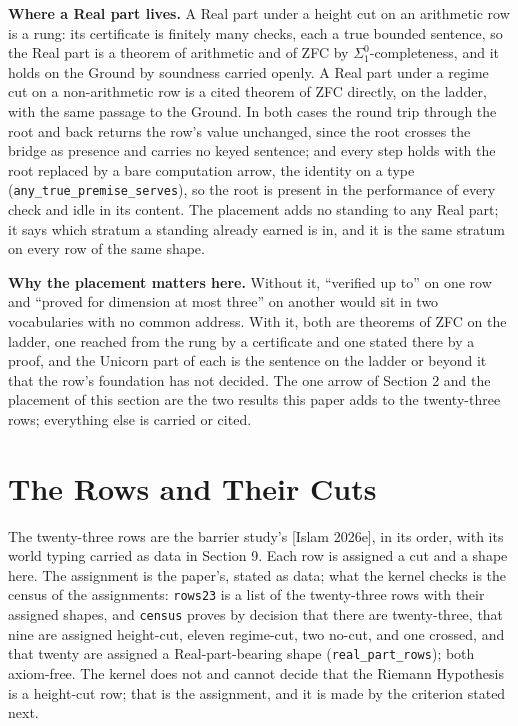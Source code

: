 \documentclass[10pt]{article}
\begin{document}
\textbf{Where a Real part lives.} A Real part under a height cut on an
arithmetic row is a rung: its certificate is finitely many checks, each
a true bounded sentence, so the Real part is a theorem of arithmetic and
of ZFC by \(\Sigma^0_1\)-completeness, and it holds on the Ground by
soundness carried openly. A Real part under a regime cut on a
non-arithmetic row is a cited theorem of ZFC directly, on the ladder,
with the same passage to the Ground. In both cases the round trip
through the root and back returns the row's value unchanged, since the
root crosses the bridge as presence and carries no keyed sentence; and
every step holds with the root replaced by a bare computation arrow, the
identity on a type (\texttt{any\_true\_premise\_serves}), so the root is
present in the performance of every check and idle in its content. The
placement adds no standing to any Real part; it says which stratum a
standing already earned is in, and it is the same stratum on every row
of the same shape.

\textbf{Why the placement matters here.} Without it, ``verified up to''
on one row and ``proved for dimension at most three'' on another would
sit in two vocabularies with no common address. With it, both are
theorems of ZFC on the ladder, one reached from the rung by a
certificate and one stated there by a proof, and the Unicorn part of
each is the sentence on the ladder or beyond it that the row's
foundation has not decided. The one arrow of Section 2 and the placement
of this section are the two results this paper adds to the twenty-three
rows; everything else is carried or cited.

\hypertarget{the-rows-and-their-cuts}{%
\section{The Rows and Their Cuts}\label{the-rows-and-their-cuts}}

The twenty-three rows are the barrier study's {[}Islam 2026e{]}, in its
order, with its world typing carried as data in Section 9. Each row is
assigned a cut and a shape here. The assignment is the paper's, stated
as data; what the kernel checks is the census of the assignments:
\texttt{rows23} is a list of the twenty-three rows with their assigned
shapes, and \texttt{census} proves by decision that there are
twenty-three, that nine are assigned height-cut, eleven regime-cut, two
no-cut, and one crossed, and that twenty are assigned a
Real-part-bearing shape (\texttt{real\_part\_rows}); both axiom-free.
The kernel does not and cannot decide that the Riemann Hypothesis is a
height-cut row; that is the assignment, and it is made by the criterion
stated next.
\end{document}
